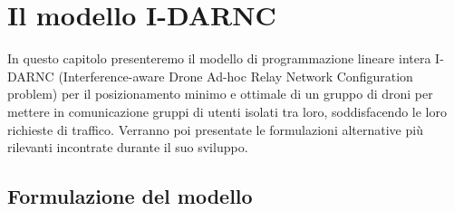  \chapter{Il modello I-DARNC} \label{chap:modello}
 In questo capitolo presenteremo il modello di programmazione lineare intera I-DARNC (Interference-aware  Drone Ad-hoc Relay Network Configuration problem) per il posizionamento minimo e ottimale di un gruppo di droni per mettere in comunicazione gruppi di utenti isolati tra loro, soddisfacendo le loro richieste di traffico. Verranno poi presentate le formulazioni alternative più rilevanti incontrate durante il suo sviluppo.\\

\ifpdf
    \graphicspath{{Chapter5/Figs/Raster/}{Chapter5/Figs/PDF/}{Chapter5/Figs/}}
\else
    \graphicspath{{Chapter5/Figs/Vector/}{Chapter5/Figs/}}
\fi

\section{Formulazione del modello}

